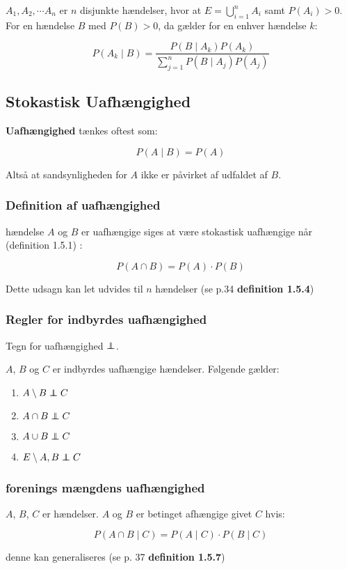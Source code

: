 $A_1, A_2, \cdots A_n$ er $n$ disjunkte hændelser, hvor at $E = \bigcup_{i=1}^n A_i$ samt $P(A_i)>0$. For en hændelse $B$ med $P(B)>0$, da gælder for en enhver hændelse $k$:

\begin{equation}
    P(A_k \mid B) = \frac{P(B\mid A_k) P(A_k)}{\sum_{j=1}^n P(B \mid A_j) P(A_j)}
\end{equation}

\subsection{Stokastisk Uafhængighed}

\textbf{Uafhængighed} tænkes oftest som:

\begin{equation}
    P(A \mid B) = P(A)
\end{equation}

Altså at sandsynligheden for $A$ ikke er påvirket af udfaldet af $B$. 

\subsubsection{Definition af uafhængighed}

hændelse $A$ og $B$ er uafhængige siges at være stokastisk uafhængige når (definition 1.5.1) :

\begin{equation}
    P(A\cap B) = P(A) \cdot P(B)
\end{equation}

Dette udsagn kan let udvides til $n$ hændelser (se p.34 \textbf{definition 1.5.4})

\subsubsection{Regler for indbyrdes uafhængighed}

Tegn for uafhængighed $\independent$.
\newline

$A$, $B$ og $C$ er indbyrdes uafhængige hændelser. Følgende gælder:

\begin{enumerate}
    \item $A\setminus B \independent C$
    \item $A \cap B \independent C$
    \item $A \cup B \independent C$
    \item $E\setminus A, B \independent C$
\end{enumerate}

\subsubsection{forenings mængdens uafhængighed}

$A$, $B$, $C$ er hændelser. $A$ og $B$ er betinget afhængige givet $C$ hvis:

\begin{equation}
    P(A \cap B \mid C) = P(A\mid C) \cdot P(B\mid C)
\end{equation}

denne kan generaliseres (se p. 37 \textbf{definition 1.5.7})

\horizline